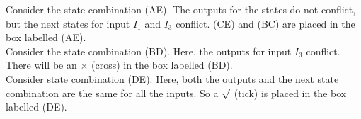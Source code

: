 \documentclass[a4]{article}
\begin{document}
\hspace*{0.5cm} Consider the state combination (AE). The outputs for the states do not conflict, but the next states for
input $I_1$ and $I_3$ conflict. (CE) and (BC) are placed in the box labelled (AE).\\
\hspace*{0.5cm} Consider the state combination (BD). Here, the outputs for input $I_3$ conflict. There will be an $\times$ (cross)
in the box labelled (BD).\\
\hspace*{0.5cm} Consider state combination (DE). Here, both the outputs and the next state combination are the same
for all the inputs. So a $ \surd$ (tick) is placed in the box labelled (DE).\\
\end{document}
